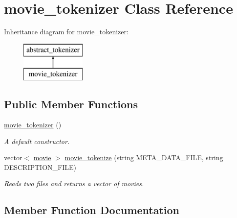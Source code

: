\hypertarget{classmovie__tokenizer}{}\section{movie\+\_\+tokenizer Class Reference}
\label{classmovie__tokenizer}
Inheritance diagram for movie\+\_\+tokenizer\+:\begin{figure}[H]
\begin{center}
\leavevmode
\includegraphics[height=2.000000cm]{classmovie__tokenizer}
\end{center}
\end{figure}
\subsection*{Public Member Functions}
\begin{DoxyCompactItemize}
\item 
\mbox{\label{classmovie__tokenizer_af30c3fa452d1d99cb97d236494a5ea0c}} 
\hyperlink{classmovie__tokenizer_af30c3fa452d1d99cb97d236494a5ea0c}{movie\+\_\+tokenizer} ()
\begin{DoxyCompactList}\small\item\em A default constructor. \end{DoxyCompactList}\item 
vector$<$ \hyperlink{classmovie}{movie} $>$ \hyperlink{classmovie__tokenizer_a84002e6539255bfb4da76f0c86238c36}{movie\+\_\+tokenize} (string M\+E\+T\+A\+\_\+\+D\+A\+T\+A\+\_\+\+F\+I\+LE, string D\+E\+S\+C\+R\+I\+P\+T\+I\+O\+N\+\_\+\+F\+I\+LE)
\begin{DoxyCompactList}\small\item\em Reads two files and returns a vector of movies. \end{DoxyCompactList}\end{DoxyCompactItemize}


\subsection{Member Function Documentation}
\mbox{\label{classmovie__tokenizer_a84002e6539255bfb4da76f0c86238c36}} 
